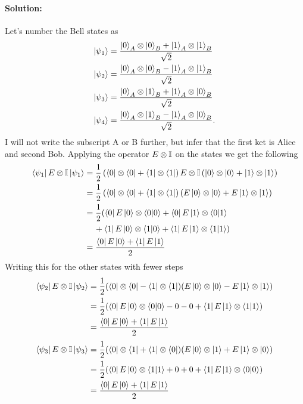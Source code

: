\paragraph{Solution:} Let's number the Bell states as 
\begin{align}
    \ket{\psi_1} &= \frac{\ket{0}_A \otimes \ket{0}_B + \ket{1}_A \otimes \ket{1}_B}{\sqrt{2}}\label{eq:00}\\
    \ket{\psi_2} &= \frac{\ket{0}_A \otimes \ket{0}_B - \ket{1}_A \otimes \ket{1}_B}{\sqrt{2}}\label{eq:01}\\
    \ket{\psi_3} &= \frac{\ket{0}_A \otimes \ket{1}_B + \ket{1}_A \otimes \ket{0}_B}{\sqrt{2}}\label{eq:10}\\
    \ket{\psi_4} &= \frac{\ket{0}_A \otimes \ket{1}_B - \ket{1}_A \otimes \ket{0}_B}{\sqrt{2}}.\label{eq:11}
\end{align}
I will not write the subscript A or B further, but infer that the first ket is Alice and second Bob. Applying the operator $E \otimes \mathbb{I}$ on the states we get the following
\begin{align}
    \bra{\psi_1} E \otimes \mathbb{I} \ket{\psi_1} &= \frac{1}{2} \left( \bra{0} \otimes \bra{0} + \bra{1} \otimes \bra{1} \right) E \otimes \mathbb{I} \left( \ket{0} \otimes \ket{0} + \ket{1} \otimes \ket{1}\right)\\
    &= \frac{1}{2} \left( \bra{0} \otimes \bra{0} + \bra{1} \otimes \bra{1} \right) \left( E\ket{0} \otimes \ket{0} + E \ket{1} \otimes \ket{1} \right)\\
    &= \frac{1}{2} ( \bra{0} E \ket{0} \otimes \bra{0}\ket{0} + \bra{0} E \ket{1} \otimes \bra{0}\ket{1}\\
    &\mspace{21mu} + \bra{1} E \ket{0} \otimes \bra{1}\ket{0} + \bra{1} E \ket{1} \otimes \bra{1} \ket{1} )\\
    &= \frac{\bra{0} E \ket{0} + \bra{1} E \ket{1}}{2}
\end{align}
Writing this for the other states with fewer steps
\begin{align}
    \bra{\psi_2} E \otimes \mathbb{I} \ket{\psi_2} &= \frac{1}{2}(\bra{0} \otimes \bra{0} - \bra{1} \otimes \bra{1}) (E \ket{0} \otimes \ket{0} - E \ket{1} \otimes \ket{1})\\
    &= \frac{1}{2}(\bra{0} E \ket{0} \otimes \bra{0}\ket{0} - 0 - 0  + \bra{1} E \ket{1} \otimes \bra{1} \ket{1})\\
    &= \frac{\bra{0} E \ket{0} + \bra{1} E \ket{1}}{2}
\end{align}
\begin{align}
    \bra{\psi_3} E \otimes \mathbb{I} \ket{\psi_3} &= \frac{1}{2} (\bra{0} \otimes \bra{1} + \bra{1} \otimes \bra{0}) (E \ket{0} \otimes \ket{1} + E \ket{1} \otimes \ket{0})\\
    &= \frac{1}{2} (\bra{0} E \ket{0} \otimes \bra{1}\ket{1} + 0 + 0 + \bra{1} E \ket{1} \otimes \bra{0}\ket{0}) \\
    &= \frac{\bra{0} E \ket{0} + \bra{1} E \ket{1}}{2}
\end{align}
